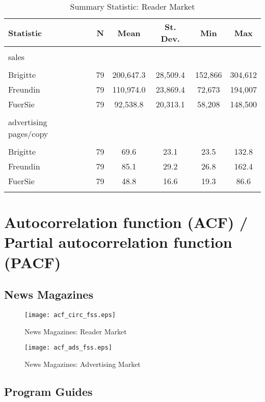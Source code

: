 \documentclass[12pt,a4paper]{scrreprt}
\begin{document}
\begin{appendices}
\begin{table}[!htbp] \centering 
  \caption{Summary Statistic: Reader Market} 
  \label{} 
\begin{tabular}{@{\extracolsep{5pt}}lccccc} 
\\[-1.8ex]\hline  
Statistic & \multicolumn{1}{c}{N} & \multicolumn{1}{c}{Mean} & \multicolumn{1}{c}{St. Dev.} & \multicolumn{1}{c}{Min} & \multicolumn{1}{c}{Max} \\ 
\hline \\[-1.8ex] 
sales \\
\hline \\[-1.8ex]
Brigitte & 79 & 200,647.3 & 28,509.4 & 152,866 & 304,612 \\ 
Freundin & 79 & 110,974.0 & 23,869.4 & 72,673 & 194,007 \\ 
FuerSie & 79 & 92,538.8 & 20,313.1 & 58,208 & 148,500 \\ 
\hline \\[-1.8ex] 
advertising pages/copy \\
\hline \\[-1.8ex] 
Brigitte & 79 & 69.6 & 23.1 & 23.5 & 132.8 \\ 
Freundin & 79 & 85.1 & 29.2 & 26.8 & 162.4 \\ 
FuerSie & 79 & 48.8 & 16.6 & 19.3 & 86.6 \\ 
\hline \\[-1.8ex] 
\end{tabular} 
\end{table}  


\section{Autocorrelation function (ACF) / Partial autocorrelation function (PACF)}

\subsection{News Magazines}

\begin{figure}[H]
\caption{News Magazines: Reader Market}
	\centering
	\texttt{[image: acf\_circ\_fss.eps]}
\end{figure}

\begin{figure}[H]
\caption{News Magazines: Advertising Market}
	\centering
	\texttt{[image: acf\_ads\_fss.eps]}
\end{figure}


\subsection{Program Guides}\label{appendix_sum_tv}


\end{appendices}
\end{document}
